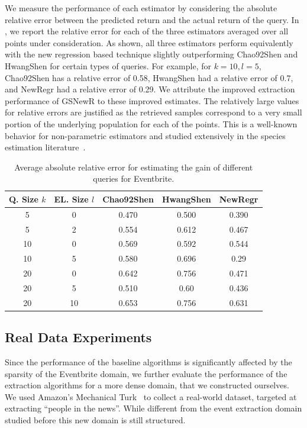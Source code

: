 We measure the performance of each estimator by considering the absolute relative error between the predicted return and the actual return of the query. In , we report the relative error for each of the three estimators averaged over all points under consideration. As shown, all three estimators perform equivalently with the new regression based technique slightly outperforming Chao92Shen and HwangShen for certain types of queries. For example, for $k = 10, l = 5$, Chao92Shen has a relative error of 0.58, HwangShen had a relative error of 0.7, and NewRegr had a relative error of 0.29. We attribute the improved extraction performance of GSNewR to these improved estimates. The relatively large values for relative errors are justified as the retrieved samples correspond to a very small portion of the underlying population for each of the points. This is a well-known behavior for non-parametric estimators and studied extensively in the species estimation literature~\cite{hwang:2010}. 

\begin{table}
\scriptsize\center
\caption{Average absolute relative error for estimating the gain of different queries for Eventbrite.}
\label{tab:eventesterror}
\begin{tabular}{|c|c|c|c|c|}
\hline
\textbf{Q. Size $k$} & \textbf{EL. Size $l$} & \textbf{Chao92Shen} & \textbf{HwangShen} & \textbf{NewRegr} \\ \hline
5 & 0 & 0.470 & 0.500 & 0.390 \\
5 & 2 & 0.554 & 0.612 & 0.467\\
10 & 0 & 0.569 & 0.592 & 0.544\\
10 & 5 & 0.580 & 0.696 & 0.29\\
20 & 0 & 0.642 & 0.756 &0.471\\
20 & 5 & 0.510 & 0.60 & 0.436 \\
20 & 10 & 0.653 & 0.756 & 0.631\\
\hline
\end{tabular}
\vspace{-10pt}
\end{table}

\subsection{Real Data Experiments}
\label{sec:realdata}
Since the performance of the baseline algorithms is significantly affected by the sparsity of the Eventbrite domain, we further evaluate the performance of the extraction algorithms for a more dense domain, that we constructed ourselves. We used Amazon's Mechanical Turk~\cite{mturk} to collect a real-world dataset, targeted at extracting ``people in the news''. While different from the event extraction domain studied before this new domain is still structured.

